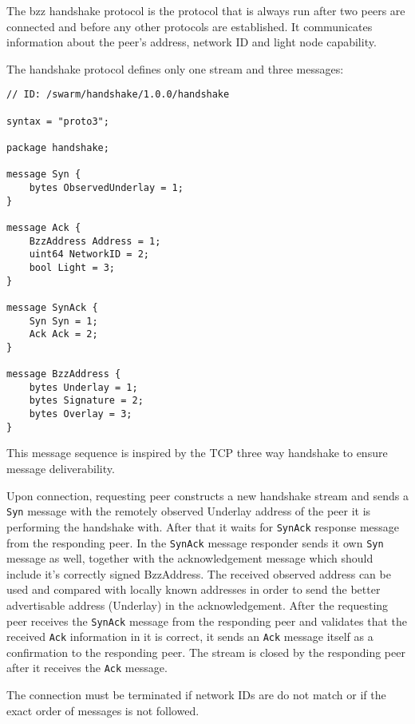 

The bzz handshake protocol is the protocol that is always run after two peers are connected and before any other protocols are established. It communicates information about the  peer's address, network ID and light node capability.

The handshake protocol defines only one stream and three messages:

\begin{definition}\label{def:bzz-messages}

\begin{lstlisting}
// ID: /swarm/handshake/1.0.0/handshake

syntax = "proto3";

package handshake;

message Syn {
    bytes ObservedUnderlay = 1;
}

message Ack {
    BzzAddress Address = 1;
    uint64 NetworkID = 2;
    bool Light = 3;
}

message SynAck {
    Syn Syn = 1;
    Ack Ack = 2;
}

message BzzAddress {
    bytes Underlay = 1;
    bytes Signature = 2;
    bytes Overlay = 3;
}
\end{lstlisting}
\end{definition}

This message sequence is inspired by the TCP three way handshake to ensure message deliverability.

Upon connection, requesting peer constructs a new handshake stream and sends a \lstinline{Syn} message with the remotely observed Underlay address of the peer it is performing the handshake with. After that it waits for \lstinline{SynAck} response message from the responding peer. In  the  \lstinline{SynAck} message responder sends it own \lstinline{Syn} message as well, together with the acknowledgement message which should include it's correctly signed BzzAddress. The received observed address can be used and compared with locally known addresses in order to send the better advertisable address (Underlay) in the acknowledgement. After the requesting peer receives the \lstinline{SynAck} message from the responding peer and validates that the received \lstinline{Ack} information in it is correct, it sends an \lstinline{Ack} message itself as a confirmation to the responding peer. The stream is closed by the responding peer after it receives the \lstinline{Ack} message.

The connection must be terminated if network IDs are do not match or if the exact order of messages is not followed.

